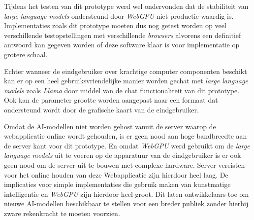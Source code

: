 \bigbreak{}

Tijdens het testen van dit prototype werd wel ondervonden dat de stabiliteit van \textit{large language models} ondersteund door \textit{WebGPU} niet productie waardig is. Implementaties zoals dit prototype moeten dus nog getest worden op veel verschillende testopstellingen met verschillende \textit{browsers} alvorens een definitief antwoord kan gegeven worden of deze software klaar is voor implementatie op grotere schaal.

\bigbreak{}

Echter wanneer de eindgebruiker over krachtige computer componenten beschikt kan er op een heel gebruiksvriendelijke manier worden gechat met 
\textit{large language models} zoals \textit{Llama} door middel van de chat functionaliteit van dit prototype. Ook kan de parameter grootte worden aangepast naar een formaat dat ondersteund wordt door de grafische kaart van de eindgebruiker.

\bigbreak{}

Omdat de AI-modellen niet worden gehost vanuit de server waarop de webapplicatie online wordt gehouden, is er geen nood aan hoge bandbreedte aan de server kant voor dit prototype. En omdat \textit{WebGPU} werd gebruikt om de \textit{large language models} uit te voeren op de apparatuur van de eindgebruiker is er ook geen nood om de server uit te bouwen met complexe hardware. Server vereisten voor het online houden van deze Webapplicatie zijn hierdoor heel laag. De implicaties voor simple implementaties die gebruik maken van kunstmatige intelligentie en \textit{WebGPU} zijn hierdoor heel groot. Dit laten ontwikkelaars toe om nieuwe AI-modellen beschikbaar te stellen voor een breder publiek zonder hierbij zware rekenkracht te moeten voorzien.